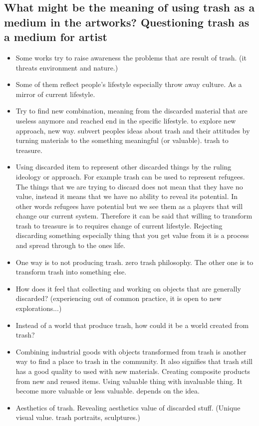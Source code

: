 \documentclass{article}
\begin{document}
\subsection{What might be the meaning of using trash as a medium in the artworks? Questioning trash as a medium for artist}
\begin{itemize}
\item Some works try to raise awareness the problems that are result of trash. (it threats environment and nature.)
\item Some of them reflect people's lifestyle especially throw away culture. As a mirror of current lifestyle.
\item Try to find new combination, meaning from the discarded material that are useless anymore and reached end in the specific lifestyle. to explore new approach, new way. subvert peoples ideas about trash and their attitudes by turning materials to the something meaningful (or valuable). trash to treasure.
\item Using discarded item to represent other discarded things by the ruling ideology or approach. For example trash can be used to represent refugees. The things that we are trying to discard does not mean that they have no value, instead it means that we have no ability to reveal its potential. In other words refugees have potential but we see them as a players that will change our current system. Therefore it can be said that willing to transform trash to treasure is to requires change of current lifestyle. Rejecting discarding something especially thing that you get value from it is a process and spread through to the ones life.
\item One way is to not producing trash. zero trash philosophy. The other one is to transform trash into something else.
\item How does it feel that collecting and working on objects that are generally discarded? (experiencing out of common practice, it is open to new explorations...)
\item Instead of a world that produce trash, how could it be a world created from trash?
\item Combining industrial goods with objects transformed from trash is another way to find a place to trash in the community. It also signifies that trash still has a good quality to used with new materials. Creating composite products from new and reused items. Using valuable thing with invaluable thing. It become more valuable or less valuable. depends on the idea.
\item Aesthetics of trash. Revealing aesthetics value of discarded stuff. (Unique visual value. trash portraits, sculptures.)
\end{itemize}
\end{document}
